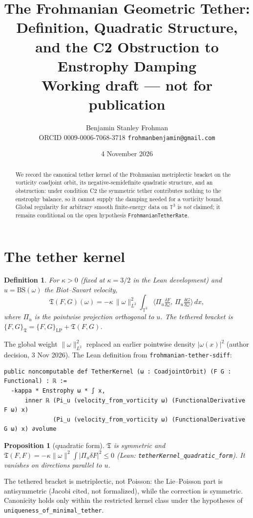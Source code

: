 \documentclass[11pt]{article}
\title{The Frohmanian Geometric Tether: Definition, Quadratic Structure,\\ and the C2 Obstruction to Enstrophy Damping\\[4pt]\large Working draft --- not for publication}
\author{Benjamin Stanley Frohman\\ ORCID 0009-0006-7068-3718 \quad \texttt{frohmanbenjamin@gmail.com}}
\date{4 November 2026}
\newtheorem{definition}{Definition}\newtheorem{proposition}{Proposition}\newtheorem{remark}{Remark}
\begin{document}
\maketitle
\begin{abstract}
We record the canonical tether kernel of the Frohmanian metriplectic bracket on the vorticity coadjoint orbit, its negative-semidefinite quadratic structure, and an obstruction: under condition C2 the symmetric tether contributes nothing to the enstrophy balance, so it cannot supply the damping needed for a vorticity bound. Global regularity for arbitrary smooth finite-energy data on $\mathbb{T}^3$ is \emph{not} claimed; it remains conditional on the open hypothesis \texttt{FrohmanianTetherRate}.
\end{abstract}

\section{The tether kernel}
\begin{definition}
For $\kappa>0$ (fixed at $\kappa=3/2$ in the Lean development) and $u=\mathrm{BS}(\omega)$ the Biot--Savart velocity,
\[\mathfrak T(F,G)(\omega)=-\kappa\,\|\omega\|_{L^2}^2\int_{\mathbb T^3}\big\langle \Pi_u\tfrac{\delta F}{\delta\omega},\,\Pi_u\tfrac{\delta G}{\delta\omega}\big\rangle\,dx,\]
where $\Pi_u$ is the pointwise projection orthogonal to $u$. The tethered bracket is $\{F,G\}_{\mathfrak T}=\{F,G\}_{\mathrm{LP}}+\mathfrak T(F,G)$.
\end{definition}
The global weight $\|\omega\|_{L^2}^2$ replaced an earlier pointwise density $|\omega(x)|^2$ (author decision, 3 Nov 2026). The Lean definition from \texttt{frohmanian-tether-sdiff}:
\begin{lstlisting}
public noncomputable def TetherKernel (ω : CoadjointOrbit) (F G : Functional) : ℝ :=
  -kappa * Enstrophy ω * ∫ x,
      inner ℝ (Pi_u (velocity_from_vorticity ω) (FunctionalDerivative F ω) x)
              (Pi_u (velocity_from_vorticity ω) (FunctionalDerivative G ω) x) ∂volume
\end{lstlisting}

\begin{proposition}[quadratic form]
$\mathfrak T$ is symmetric and $\mathfrak T(F,F)=-\kappa\|\omega\|^2\int|\Pi_u\delta F|^2\le 0$ (Lean: \texttt{tetherKernel\_quadratic\_form}). It vanishes on directions parallel to $u$.
\end{proposition}
The tethered bracket is metriplectic, not Poisson: the Lie--Poisson part is antisymmetric (Jacobi cited, not formalized), while the correction is symmetric. Canonicity holds only within the restricted kernel class under the hypotheses of \texttt{uniqueness\_of\_minimal\_tether}.
\end{document}

